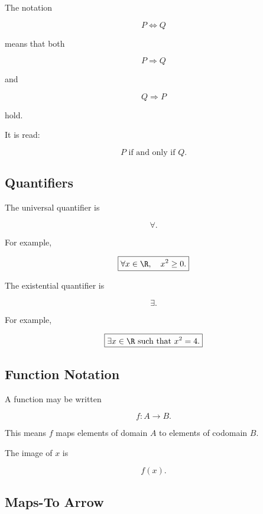 The notation

\[
\boxed{
P\Leftrightarrow Q
}
\]

means that both

\[
P\Rightarrow Q
\]

and

\[
Q\Rightarrow P
\]

hold.

It is read:

\[
\boxed{
P\text{ if and only if }Q.
}
\]

\subsection{Quantifiers}
\label{subsec:quantifier-symbols}

The universal quantifier is

\[
\boxed{
\forall.
}
\]

For example,

\[
\boxed{
\forall x\in\R,
\quad
x^2\geq0.
}
\]

The existential quantifier is

\[
\boxed{
\exists.
}
\]

For example,

\[
\boxed{
\exists x\in\R
\text{ such that }
x^2=4.
}
\]

\subsection{Function Notation}
\label{subsec:function-notation-reference}

A function may be written

\[
\boxed{
f:A\to B.
}
\]

This means \(f\) maps elements of domain \(A\) to elements of codomain \(B\).

The image of \(x\) is

\[
\boxed{
f(x).
}
\]

\subsection{Maps-To Arrow}
\label{subsec:maps-to-arrow}

